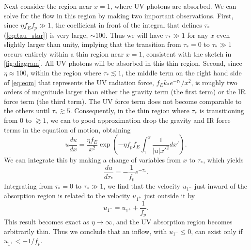 \documentclass[useAMS,usenatbib]{mn2e}
\begin{document}
Next consider the region near $x=1$, where UV photons are absorbed. We can solve for the flow in this region by making two important observations. First, since $\eta f_E f_p \gg 1$, the coefficient in front of the integral that defines $\tau_*$ (\autoref{eq:tau_star}) is very large, $\sim 100$. Thus we will have $\tau_* \gg 1$ for any $x$ even slightly larger than unity, implying that the transition from $\tau_* = 0$ to $\tau_* \gg 1$ occurs entirely within a thin region near $x=1$, consistent with the sketch in \autoref{fig:diagram}. All UV photons will be absorbed in this thin region. Second, since $\eta \approx 100$, within the region where $\tau_* \lesssim 1$, the middle term on the right hand side of \autoref{eq:eom} that represents the UV radiation force, $f_E k_* e^{-\tau_*}/x^2$, is roughly two orders of magnitude larger than either the gravity term (the first term) or the IR force term (the third term). The UV force term does not become comparable to the others until $\tau_* \gtrsim 5$. Consequently, in the thin region where $\tau_*$ is transitioning from $0$ to $\gtrsim 1$, we can to good approximation drop the gravity and IR force terms in the equation of motion, obtaining 
\begin{equation}
u \frac{du}{dx} = \frac{\eta f_E}{x^2} \exp\left(-\eta f_p f_E \int_1^x \frac{1}{|u| x'^2} dx'\right).
\end{equation}
We can integrate this by making a change of variables from $x$ to $\tau_*$, which yields
\begin{equation}
\frac{du}{d\tau_*} = -\frac{1}{f_p} e^{-\tau_*}.
\end{equation}
Integrating from $\tau_* = 0$ to $\tau_* \gg 1$, we find that the velocity $u_{1^-}$ just inward of the absorption region is related to the velocity $u_{1^+}$ just outside it by
\begin{equation}
u_{1^-} = u_{1^+} + \frac{1}{f_p}.
\end{equation}
This result becomes exact as $\eta \rightarrow \infty$, and the UV absorption region becomes arbitrarily thin. Thus we conclude that an inflow, with $u_{1^-} \leq 0$, can exist only if $u_{1^+} < -1/f_p$.
\end{document}
